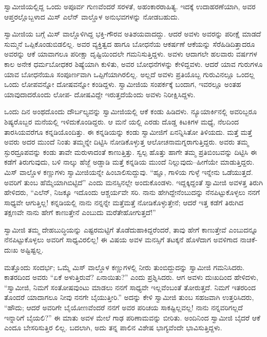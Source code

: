 ಸ್ವಾಮೀಜಿಯಲ್ಲಿದ್ದ ಒಂದು ಅಪೂರ್ವ ಗುಣವೆಂದರೆ ಸರಳತೆ, ಅಹಂಕಾರರಾಹಿತ್ಯ. ಇದಕ್ಕೆ ಉದಾಹರಣೆಯಾಗಿ, ಅವರ ಆಪ್ತರಲ್ಲೊಬ್ಬಳಾದ ಮಿಸ್ ಎಲೆನ್ ವಾಲ್ಡೊಳ ಅನುಭವಗಳನ್ನು ನೋಡಬಹುದು.

ಸ್ವಾಮೀಜಿಯ ಬಗ್ಗೆ ಮಿಸ್ ವಾಲ್ಡೊಳಿಗಿದ್ದ ಭಕ್ತಿ-ಗೌರವ ಅತಿಶಯವಾದದ್ದು. ಆದರೆ ಅವಳು ಅವರನ್ನು ಪರೀಕ್ಷೆ ಮಾಡದೆ ಸುಮ್ಮನೆ ಒಪ್ಪಿಕೊಂಡುಬಿಡಲಿಲ್ಲ. ಅವರ ವ್ಯಕ್ತಿತ್ವದ ಹಾಗೂ ಬೋಧನೆಯ ಆಕರ್ಷಣೆ ಆಕೆಯನ್ನು ಸೆರೆಹಿಡಿದಿತ್ತಾದರೂ ಅವರನ್ನು ಆಕೆ ಯಾವಾಗಲೂ ಪರೀಕ್ಷಾ ದೃಷ್ಟಿಯಿಂದಲೇ ಗಮನಿಸುತ್ತಿದ್ದಳು. ಅವಳು ಆದಾಗಲೇ ಹಲವಾರು ವರ್ಷಗಳ ಕಾಲ ಅನೇಕ ಧರ್ಮಬೋಧಕರ ಶಿಷ್ಯೆಯಾಗಿ ಕುಳಿತು, ಅವರ ಬೋಧನೆಗಳನ್ನು ಕೇಳಿದ್ದವಳು. ಆದರೆ ಯಾವ ಗುರುಗಳೂ ಯಾವ ಬೋಧನೆಯೂ ಸಂಪೂರ್ಣವಾಗಿ ಒಪ್ಪಿಗೆಯಾಗಿರಲಿಲ್ಲ. ಅಲ್ಲದೆ ಅವಳು ಪ್ರತಿಯೊಬ್ಬ ಗುರುವಿನಲ್ಲೂ ಒಂದಲ್ಲ ಒಂದು ಲೋಪವನ್ನೋ ದೋಷವನ್ನೋ ಕಂಡಿದ್ದಳು. ಸ್ವಾಮೀಜಿಯ ಸಂಪರ್ಕಕ್ಕೆ ಬಂದಾಗ, ಇವರಲ್ಲೂ ಅಂತಹ ಯಾವುದಾದರೊಂದು ಲೋಪ- ದೋಷವಿದ್ದೇ ಇರುತ್ತದೆಯೆಂದು ಅವಳು ನಿರೀಕ್ಷಿಸಿದ್ದಳು.

ಒಂದು ದಿನ ಅಂಥದೊಂದು ದೌರ್ಬಲ್ಯವನ್ನು ಸ್ವಾಮೀಜಿಯಲ್ಲಿ ಆಕೆ ಕಂಡು ಹಿಡಿದಳು. ನ್ಯೂಯಾರ್ಕಿನಲ್ಲಿ ಅವರಿಬ್ಬರೂ ಶಿಷ್ಯರೊಬ್ಬರ ಮನೆಯಲ್ಲಿ ಇಳಿದುಕೊಂಡಿದ್ದರು. ಆ ಮನೆ ಯಲ್ಲಿ ಎರಡು ದೊಡ್ಡ ಕಿಟಕಿಗಳ ಮಧ್ಯೆ, ನೆಲದಿಂದ ತಾರಸಿಯವರೆಗೂ ಕನ್ನಡಿಯೊಂದಿತ್ತು. ಈ ಕನ್ನಡಿಯನ್ನು ಕಂಡು ಸ್ವಾಮೀಜಿಗೆ ಏನನ್ನಿಸಿತೋ ತಿಳಿಯದು. ಮತ್ತೆ ಮತ್ತೆ ಅವರು ಅದರ ಮುಂದೆ ನಿಂತು ತಮ್ಮನ್ನೇ ದಿಟ್ಟಿಸಿ ನೋಡಿಕೊಳ್ಳುತ್ತ ಆಲೋಚನಾಮಗ್ನರಾಗುತ್ತಿದ್ದರು. ಅವರು ತಮ್ಮ ಸ್ಫುರದ್ರೂಪವನ್ನು ಕಂಡು ತಾವೇ ಮರುಳಾದಂತೆ ಕಾಣುತ್ತಿತ್ತು. ಸ್ವಲ್ಪ ಹೊತ್ತು ಹಾಗೇ ತಮ್ಮ ಪ್ರತಿಬಿಂಬವನ್ನು ದಿಟ್ಟಿಸಿ ಈ ಕಡೆಗೆ ತಿರುಗುವುದು, ಬಳಿ ನಾಲ್ಕು ಹೆಜ್ಜೆ ಅಡ್ಡಾಡಿ ಮತ್ತೆ ಕನ್ನಡಿಯ ಮುಂದೆ ನಿಲ್ಲುವುದು–ಹೀಗೆಯೇ ಮಾಡುತ್ತಿದ್ದರು. ಮಿಸ್ ವಾಲ್ಡೊಳ ಕಣ್ಣುಗಳು ಸ್ವಾಮೀಜಿಯನ್ನೇ ಹಿಂಬಾಲಿಸುದ್ದುವು. “ಹ್ಞೂ, ಗಾಳಿಯ ಗುಳ್ಳೆ ಇನ್ನೇನು ಒಡೆಯುತ್ತದೆ. ಅವರಿಗೆ ತುಂಬ ಹೆಮ್ಮೆಯಾಗಿಬಿಟ್ಟಿದೆ” ಎಂದು ಮನಸ್ಸಿನಲ್ಲೇ ಅಂದುಕೊಂಡಳು. ಇದ್ದಕ್ಕಿದ್ದಂತೆ ಸ್ವಾಮೀಜಿ ಅವಳತ್ತ ತಿರುಗಿ ಹೇಳಿದರು, “ಎಲೆನ್, ನಿಜಕ್ಕೂ ಇದೊಂದು ಆಶ್ಚರ್ಯವೇ ಸರಿ. ನಾನು ಹೇಗಿದ್ದೇನೆಂಬುದನ್ನು ನೆನಪಿಟ್ಟುಕೊಳ್ಳಲು ನನಗೆ ಸಾಧ್ಯವೇ ಆಗುತ್ತಿಲ್ಲ! ಕನ್ನಡಿಯಲ್ಲಿ ನಾನು ನನ್ನನ್ನೇ ಮತ್ತೆಮತ್ತೆ ನೋಡಿಕೊಳ್ಳುತ್ತೇನೆ; ಆದರೆ ಇತ್ತ ಕಡೆಗೆ ತಿರುಗಿದ ತಕ್ಷಣವೇ ನಾನು ಹೇಗೆ ಕಾಣುತ್ತೇನೆ ಎಂಬುದು ಮರೆತೇಹೋಗುತ್ತದೆ!”

ಸ್ವಾಮೀಜಿ ತಮ್ಮ ದೇಹಬುದ್ಧಿಯನ್ನು ಎಷ್ಟರಮಟ್ಟಿಗೆ ತೊಡೆದುಹಾಕಿದ್ದರೆಂದರೆ, ತಾವು ಹೇಗೆ ಕಾಣುತ್ತೇವೆ ಎಂಬುದನ್ನೂ ನೆನಪಿಟ್ಟುಕೊಳ್ಳಲು ಅವರಿಗೆ ಸಾಧ್ಯವಿರಲಿಲ್ಲ! ಈ ವಿಷಯ ಅವಳ ಮನಸ್ಸಿಗೆ ತಟಕ್ಕನೆ ಹೊಳೆದಾಗ ಅವಳಿಗಾದ ನಾಚಿಕೆ-ದುಃಖ ಅಷ್ಟಿಷ್ಟಲ್ಲ.

ಮತ್ತೊಂದು ಸಂದರ್ಭ; ಒಮ್ಮೆ ಮಿಸ್ ವಾಲ್ಡೊಳ ಕಣ್ಣುಗಳಲ್ಲಿ ನೀರು ತುಂಬಿದ್ದುದನ್ನು ಸ್ವಾಮೀಜಿ ಗಮನಿಸಿದರು. ಕಾತರದಿಂದ ಅವರು “ಏಕೆ ಅಳುತ್ತಿರುವೆ? ಏನಾಯಿತು?” ಎಂದು ಪ್ರಶ್ನಿಸಿದರು. ಆಗ ಅವಳು ದುಃಖದಿಂದ ಹೇಳಿದಳು, “ಸ್ವಾಮೀಜಿ, ನಿಮಗೆ ಸಂತೋಷವುಂಟು ಮಾಡಲು ನನಗೆ ಸಾಧ್ಯವೇ ಇಲ್ಲವೆಂಬಂತೆ ತೋರುತ್ತದೆ. ನಿಮಗೆ ಇತರರಿಂದ ತೊಂದರೆ ಯಾದಾಗಲೂ ನೀವು ನನಗೇ ಬೈಯುತ್ತೀರಿ.” ಅದನ್ನು ಕೇಳಿ ಸ್ವಾಮೀಜಿ ತುಂಬ ಸಹಜವಾಗಿ ಉತ್ತರಿಸಿದರು, “ಹೌದು; ಆದರೆ ಅವರಿಗೇ ಬೈಯೋಣವೆಂದರೆ ನನಗೆ ಅವರ ಪರಿಚಯ ಸಾಕಷ್ಟಿಲ್ಲವಲ್ಲ! ನಾನು ನನ್ನವರಿಗಲ್ಲದೆ ಇನ್ನಾರಿಗೆ ಬೈಯಲಿ?” ಈ ಮಾತು ಅವಳ ಮೇಲೆ ಗಾಢ ಪರಿಣಾಮವನ್ನು ಬೀರಿತು. ಅಂದಿನಿಂದ ಸ್ವಾಮೀಜಿ ಬೈದರೆ ಆಕೆ ಎಂದೂ ಬೇಸರಿಸುತ್ತಿರ ಲಿಲ್ಲ. ಬದಲಾಗಿ, ಅದು ತನ್ನ ಪಾಲಿನ ವಿಶೇಷ ಭಾಗ್ಯವೆಂದೇ ಭಾವಿಸುತ್ತಿದ್ದಳು.

